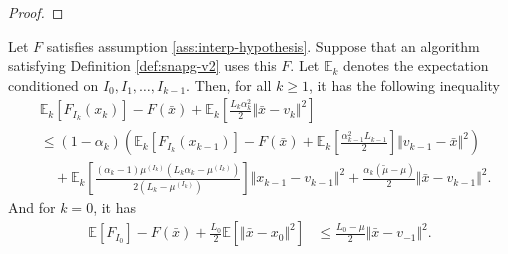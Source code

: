 \documentclass[12pt]{article}
\begin{document}
    \begin{proof}
        
    \end{proof}
    \begin{theorem}\label{thm:snapg2-one-step}
        Let $F$ satisfies assumption \ref{ass:interp-hypothesis}. 
        Suppose that an algorithm satisfying Definition \ref{def:snapg-v2} uses this $F$. 
        Let $\mathbb E_k$ denotes the expectation conditioned on $I_0, I_1, \ldots, I_{k - 1}$. 
        Then, for all $k \ge 1$, it has the following inequality 
        \begin{align*}
            & \mathbb E_k\left[F_{I_k}(x_{k})\right] 
            - F(\bar x) 
            + \mathbb E_k\left[
                \frac{L_k\alpha_k^2}{2}\Vert \bar x - v_k\Vert^2 
            \right]
            \\
            &\le 
            (1 - \alpha_k)\left(
                    \mathbb E_k \left[F_{I_k}(x_{k - 1})\right] 
                    - F(\bar x)
                    + \mathbb E_k \left[\frac{\alpha_{k - 1}^2L_{k - 1}}{2}\right]\Vert v_{k - 1} - \bar x\Vert^2
            \right)
                \\ &\quad 
                + \mathbb E_k\left[
                    \frac{(\alpha_k - 1)\mu^{(I_k)}\left(L_k\alpha_k - \mu^{(I_k)}\right)}{2\left(L_k - \mu^{(I_k)}\right)}
                \right]\Vert x_{k - 1} - v_{k - 1} \Vert^2
                + \frac{\alpha_k(\tilde\mu - \mu)}{2} 
                \Vert \bar x - v_{k - 1}\Vert^2. 
        \end{align*}
        And for $k = 0$, it has 
        \begin{align*}
            \mathbb E \left[ F_{I_0}\right] - F(\bar x) 
            + \frac{L_0}{2}\mathbb E \left[\Vert \bar x - x_0\Vert^2\right]
            &\le 
            \frac{L_0 - \mu}{2}\Vert \bar x - v_{-1}\Vert^2. 
        \end{align*}
    \end{theorem}
\end{document}
